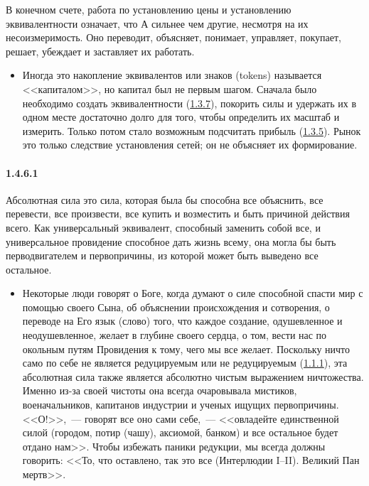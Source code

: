 В конечном счете, работа по установлению цены и установлению эквивалентности означает, что А сильнее чем другие, несмотря на их несоизмеримость. Оно переводит, объясняет, понимает, управляет, покупает, решает, убеждает и заставляет их работать. 
	\begin{itemize}
	\item Иногда это накопление эквивалентов или знаков (tokens) называется <<капиталом>>, но капитал был не первым шагом. Сначала было необходимо создать эквивалентности (\hyperlink{par:1.3.7}{1.3.7}), покорить силы и удержать их в одном месте достаточно долго для того, чтобы определить их масштаб и измерить. Только потом стало возможным подсчитать прибыль (\hyperlink{par:1.3.5}{1.3.5}). Рынок это только следствие установления сетей; он не объясняет их формирование.
	\end{itemize}

\paragraph{1.4.6.1}\hypertarget{par:1.4.6.1}{} Абсолютная сила это сила, которая была бы способна все объяснить, все перевести, все произвести, все купить и возместить и быть причиной действия всего. Как универсальный эквивалент, способный заменить собой все, и универсальное провидение способное дать жизнь всему, она могла бы быть перводвигателем и первопричины, из которой может быть выведено все остальное. 
	\begin{itemize}
	\item Некоторые люди говорят о Боге, когда думают о силе способной спасти мир с помощью своего Сына, об объяснении происхождения и сотворения, о переводе на Его язык (слово) того, что каждое создание, одушевленное и неодушевленное, желает в глубине своего сердца, о том, вести нас по окольным путям Провидения к тому, чего мы все желает. Поскольку ничто само по себе не является редуцируемым или не редуцируемым (\hyperlink{par:1.1.1}{1.1.1}), эта абсолютная сила также является абсолютно чистым выражением ничтожества. Именно из-за своей чистоты она всегда очаровывала мистиков, военачальников, капитанов индустрии и ученых ищущих первопричины. <<О!>>,~--- говорят все оно сами себе,~--- <<овладейте единственной силой (городом, потир (чашу), аксиомой, банком) и все остальное будет отдано нам>>. Чтобы избежать паники редукции, мы всегда должны говорить: <<То, что оставлено, так это все (Интерлюдии I--II). Великий Пан мертв>>.
	\end{itemize}


